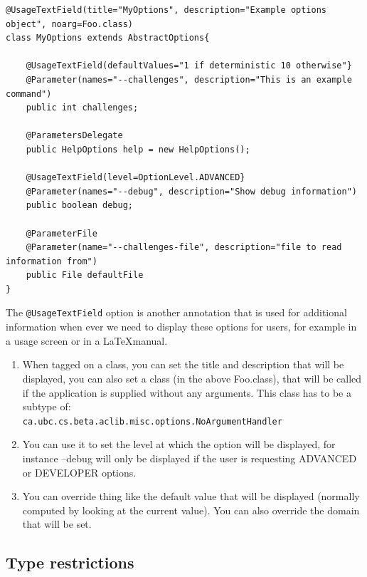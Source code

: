 \documentclass[11pt,letterpaper,oneside]{article}
\begin{document}
\begin{small}
\begin{lstlisting}[]
@UsageTextField(title="MyOptions", description="Example options object", noarg=Foo.class)
class MyOptions extends AbstractOptions{

	@UsageTextField(defaultValues="1 if deterministic 10 otherwise"}
	@Parameter(names="--challenges", description="This is an example command")
	public int challenges;
	
	@ParametersDelegate 
	public HelpOptions help = new HelpOptions();

	@UsageTextField(level=OptionLevel.ADVANCED}
	@Parameter(names="--debug", description="Show debug information")
	public boolean debug;

	@ParameterFile
	@Parameter(name="--challenges-file", description="file to read information from")
	public File defaultFile
}
\end{lstlisting}
\end{small}

The \texttt{@UsageTextField} option is another annotation that is used for additional information when ever we need to display these options for users, for example in a usage screen or in a \LaTeX manual. 

\begin{enumerate} 
\item When tagged on a class, you can set the title and description that will be displayed, you can also set a class (in the above Foo.class), that will be called if the application is supplied without any arguments. This class has to be a subtype of:\\ \texttt{ca.ubc.cs.beta.aclib.misc.options.NoArgumentHandler}

\item You can use it to set the level at which the option will be displayed, for instance --debug will only be displayed if the user is requesting ADVANCED or DEVELOPER options.

\item You can override thing like the default value that will be displayed (normally computed by looking at the current value). You can also override the domain that will be set.
\end{enumerate}


\subsection{Type restrictions}
\end{document}
